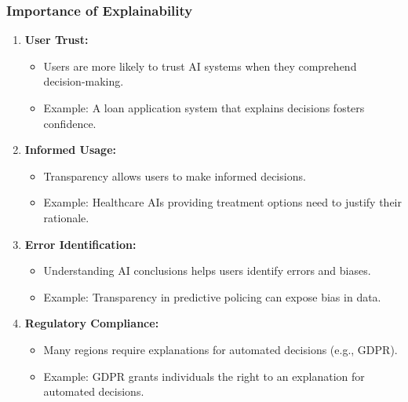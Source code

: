 \documentclass[aspectratio=169]{beamer}
\begin{document}
\begin{frame}[fragile]
    \frametitle{Importance of Explainability}
    \begin{enumerate}
        \item \textbf{User Trust:}
            \begin{itemize}
                \item Users are more likely to trust AI systems when they comprehend decision-making.
                \item Example: A loan application system that explains decisions fosters confidence.
            \end{itemize}
        
        \item \textbf{Informed Usage:}
            \begin{itemize}
                \item Transparency allows users to make informed decisions.
                \item Example: Healthcare AIs providing treatment options need to justify their rationale.
            \end{itemize}
        
        \item \textbf{Error Identification:}
            \begin{itemize}
                \item Understanding AI conclusions helps users identify errors and biases.
                \item Example: Transparency in predictive policing can expose bias in data.
            \end{itemize}
        
        \item \textbf{Regulatory Compliance:}
            \begin{itemize}
                \item Many regions require explanations for automated decisions (e.g., GDPR).
                \item Example: GDPR grants individuals the right to an explanation for automated decisions.
            \end{itemize}
    \end{enumerate}
\end{frame}
\end{document}

